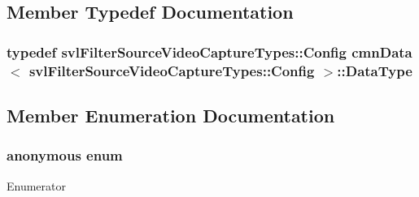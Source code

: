 \subsection{Member Typedef Documentation}
\hypertarget{classcmn_data_3_01svl_filter_source_video_capture_types_1_1_config_01_4_aff938e4d56457fbe9133d8b6cbcd5490}{
\subsubsection[{Data\-Type}]{\setlength{\rightskip}{0pt plus 5cm}typedef {\bf svl\-Filter\-Source\-Video\-Capture\-Types\-::\-Config} {\bf cmn\-Data}$<$ {\bf svl\-Filter\-Source\-Video\-Capture\-Types\-::\-Config} $>$\-::{\bf Data\-Type}}}\label{classcmn_data_3_01svl_filter_source_video_capture_types_1_1_config_01_4_aff938e4d56457fbe9133d8b6cbcd5490}


\subsection{Member Enumeration Documentation}
\hypertarget{classcmn_data_3_01svl_filter_source_video_capture_types_1_1_config_01_4_a1698b7fd0265afe0ffd08cae3e63fcc5}{\subsubsection[{anonymous enum}]{\setlength{\rightskip}{0pt plus 5cm}anonymous enum}}\label{classcmn_data_3_01svl_filter_source_video_capture_types_1_1_config_01_4_a1698b7fd0265afe0ffd08cae3e63fcc5}
\begin{Desc}
\item[Enumerator]\par
\begin{description}
\item[{\em 
\hypertarget{classcmn_data_3_01svl_filter_source_video_capture_types_1_1_config_01_4_a1698b7fd0265afe0ffd08cae3e63fcc5abcffae4188f1c2ab2261eeaa659ca91f}{I\-S\-\_\-\-S\-P\-E\-C\-I\-A\-L\-I\-Z\-E\-D}\label{classcmn_data_3_01svl_filter_source_video_capture_types_1_1_config_01_4_a1698b7fd0265afe0ffd08cae3e63fcc5abcffae4188f1c2ab2261eeaa659ca91f}
}]\end{description}
\end{Desc}



